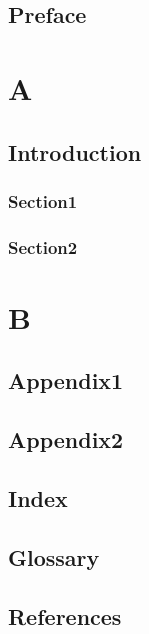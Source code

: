 \documentclass{book}
\begin{document}
\tableofcontents

\frontmatter
\chapter{Preface}
\mainmatter
\part{A}
\chapter{Introduction}
\section{Section1}
\section{Section2}
\part{B}
\appendix
\chapter{Appendix1}
\chapter{Appendix2}
\backmatter
\chapter{Index}
\chapter{Glossary}
\chapter{References}
\end{document}
